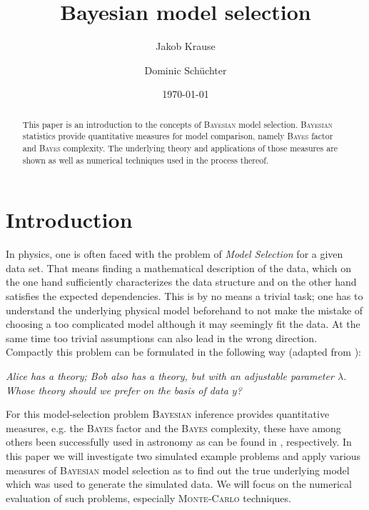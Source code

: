 \documentclass[%
 reprint,
 amsmath,amssymb,
 aps,
]{revtex4-1}
\begin{document}
\title{Bayesian model selection}%

\author{Jakob Krause}
\author{Dominic Schüchter}

\date{\today}%

\begin{abstract}
\noindent This paper is an introduction to the concepts of \textsc{Bayesian} model selection. \textsc{Bayesian} statistics provide quantitative measures for model comparison, namely \textsc{Bayes} factor and \textsc{Bayes} complexity. The underlying theory and applications of those measures are shown as well as numerical techniques used in the process thereof.
\end{abstract}
\maketitle


\section{\label{sec:intro}Introduction}
\noindent In physics, one is often faced with the problem of \emph{Model Selection} for a given data set. That means finding a mathematical description of the data, which on the one hand sufficiently characterizes the data structure and on the other hand satisfies the expected dependencies. This is by no means a trivial task; one has to understand the underlying physical model beforehand to not make the mistake of choosing a too complicated model although it may seemingly fit the data. At the same time too trivial assumptions can also lead in the wrong direction. Compactly this problem can be formulated in the following way (adapted from \cite[Chap. 4]{sivia}):

\begin{center}
	\emph{Alice has a theory; Bob also has a theory, but with an adjustable parameter $\lambda$. Whose theory should we prefer on the basis of data $y$?}
\end{center}



For this model-selection problem \textsc{Bayesian} inference provides quantitative measures, e.g. the \textsc{Bayes} factor and the \textsc{Bayes} complexity, these have among others been successfully used in astronomy as can be found in \cite{trotta,kunz,Trotta_2008}, respectively. In this paper we will investigate two simulated example problems and apply various measures of \textsc{Bayesian} model selection as to find out the true underlying model which was used to generate the simulated data. We will  focus on the numerical evaluation of such problems, especially\textsc{ Monte-Carlo} techniques.
\end{document}
